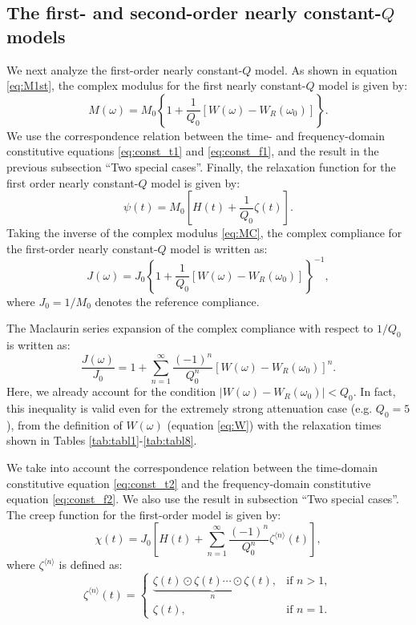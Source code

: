 \documentclass[article]{./macros/elsarticle_qh}
\begin{document}
\subsection{The first- and second-order nearly constant-$Q$ models}
We next analyze the first-order nearly constant-$Q$ model. As shown in equation \ref{eq:M1st}, the complex modulus for the first nearly constant-$Q$ model is given by:
\begin{equation} \label{eq:M1st_v2}
M(\omega) = M_{0} \left \{
1 + \frac{1}{Q_{0}} \left[W(\omega) - W_{R}(\omega_{0}) \right]
\right \} .
\end{equation}
We use the correspondence relation between the time- and frequency-domain constitutive equations \ref{eq:const_t1} and \ref{eq:const_f1}, and the result in the previous subsection ``Two special cases''. Finally, the relaxation function for the first order nearly constant-$Q$ model is given by:
\begin{equation} \label{eq:psi1_ele}
\psi(t) = M_{0} \left[
H(t) + \frac{1}{Q_{0}} \zeta(t)
\right] .
\end{equation}
Taking the inverse of the complex modulus \ref{eq:MC}, the complex compliance for the first-order nearly constant-$Q$ model is written as:
\begin{equation} 
J(\omega) = J_{0} 
\left \{
1 + \frac{1}{Q_{0}} \left[W(\omega) - W_{R}(\omega_{0}) \right]
\right \}^{-1} ,
\end{equation}
where $J_{0}=1/M_{0}$ denotes the reference compliance.

The Maclaurin series expansion of the complex compliance with respect to $1/Q_{0}$ is written as:
\begin{equation}
\frac{J(\omega)}{J_{0}} = 1 + 
\sum_{n=1}^{\infty} \frac{(-1)^{n}}{Q_{0}^{n}}
\left[W(\omega) - W_{R}(\omega_{0}) \right]^{n} .
\end{equation}
Here, we already account for the condition $|W(\omega) - W_{R}(\omega_{0})| < Q_{0}$. In fact, this inequality is valid even for the extremely strong attenuation case (e.g. $Q_{0} = 5$), from the definition of $W(\omega)$ (equation \ref{eq:W}) with the relaxation times shown in Tables \ref{tab:tabl1}-\ref{tab:tabl8}. 

We take into account the correspondence relation between the time-domain constitutive equation \ref{eq:const_t2} and the frequency-domain constitutive equation \ref{eq:const_f2}. We also use the result in subsection ``Two special cases''. The creep function for the first-order model is given by:
\begin{equation} \label{eq:chi1}
\chi(t) = J_{0} \left[
H(t) + 
\sum_{n=1}^{\infty} \frac{(-1)^{n}}{Q_{0}^n} \zeta^{\langle n \rangle}(t)  
\right] ,
\end{equation}
where $\zeta^{\langle n \rangle}$ is defined as:
\begin{equation}
\zeta^{\langle n \rangle}(t) =
\begin{cases}
\underbrace{\zeta(t) \odot \zeta(t) \cdots \odot \zeta(t)}_{n}, & \text{if } n > 1, \\
\zeta(t), & \text{if } n = 1 .
\end{cases}
\end{equation}
\end{document}
